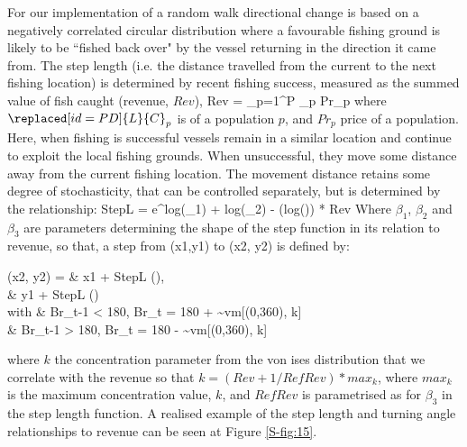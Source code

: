 \documentclass[review]{elsarticle}
\let\oldequation\equation
\let\oldendequation\endequation
\renewenvironment{equation}
 {\linenomathNonumbers\oldequation}
 {\oldendequation\endlinenomath}
\begin{document}
For our implementation of a random walk directional change is based on a
negatively correlated circular distribution where a favourable fishing ground
is likely to be ``fished back over" by the vessel returning in the direction it
came from.  The step length (i.e. the distance travelled from the current to
the next fishing location) is determined by  recent
fishing success, measured as the summed value of fish caught (revenue, $Rev$),
\begin{equation}
Rev = \sum_{p=1}^{P} _{p} \cdot Pr_{p} 
\end{equation}
where $\replaced[id=PD]{L}{C}_{p}$ is  of a
population $p$, and $Pr_{p}$ price of a population. Here, when fishing is
successful vessels remain in a similar location and continue to exploit the
local fishing grounds. When unsuccessful, they move some distance away from
the current fishing location.  The movement distance retains some degree of
stochasticity, that can be controlled separately, but is determined by the
relationship: 
\begin{equation}
	StepL = e^{log(\beta_{1}) + log(\beta_{2}) -
		(log())} * Rev
\end{equation}
Where $\beta_{1}$, $\beta_{2}$ and $\beta_{3}$ are parameters determining the
shape of the step function in its relation to revenue, so that, a step from
(x1,y1) to (x2, y2) is defined by:
\begin{equation}
	\begin{split}
 (x2, y2) =  & x1 + StepL \cdot \cos (), \\
             & y1 + StepL \cdot \sin () \\	
 with  \hspace{0.5cm}     & Br_{t-1} < 180, Br_{t} = 180 + \sim vm[(0,360), k] \\
 			  & Br_{t-1} > 180, Br_{t} = 180 - \sim vm[(0,360), k] \\
	\end{split}
\end{equation}
where $k$ the concentration parameter from the von ises
distribution that we correlate with the revenue so that $k = (Rev + 1 /
RefRev) * max_{k}$, where $max_{k}$ is the maximum concentration value, $k$,
and $RefRev$ is parametrised as for $\beta_{3}$ in the step length function. A
realised example of the step length and turning angle relationships to revenue
can be seen at Figure \ref{S-fig:15}.
\end{document}

